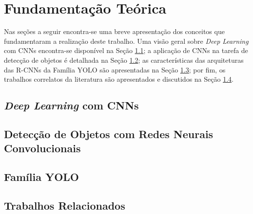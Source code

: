 \chapter{Fundamentação Teórica} \label{cap:fundamentacao}

Nas seções a seguir encontra-se uma breve apresentação dos conceitos que fundamentaram a realização deste trabalho. Uma visão geral sobre \emph{Deep Learning} com CNNs encontra-se disponível na Seção \ref{sec:deepLearning}; a aplicação de CNNs na tarefa de detecção de objetos é detalhada na Seção \ref{sec:fundamenta:deteccao}; as características das arquiteturas das R-CNNs da Família YOLO são apresentadas na Seção \ref{sec:fund:yolo}; por fim, os trabalhos correlatos da literatura são apresentados e discutidos na Seção \ref{sec:fund:relacionados}.

\section{\emph{Deep Learning} com CNNs} \label{sec:deepLearning}


\section{Detecção de Objetos com Redes Neurais Convolucionais} \label{sec:fundamenta:deteccao}



\section{Família YOLO} \label{sec:fund:yolo}


\section{Trabalhos Relacionados} \label{sec:fund:relacionados}
